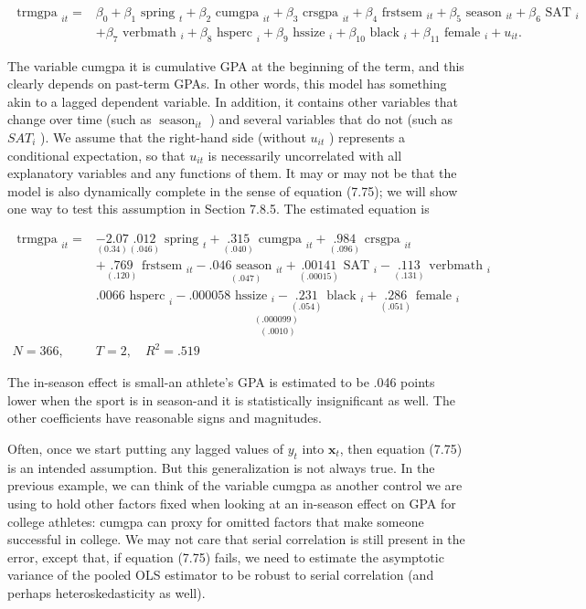 \documentclass[10pt]{article}
\begin{document}
$$
\begin{aligned}
\text { trmgpa }_{i t}= & \beta_{0}+\beta_{1} \text { spring }_{t}+\beta_{2} \text { cumgpa }_{i t}+\beta_{3} \text { crsgpa }_{i t}+\beta_{4} \text { frstsem }_{i t}+\beta_{5} \text { season }_{i t}+\beta_{6} \text { SAT }_{i} \\
& +\beta_{7} \text { verbmath }_{i}+\beta_{8} \text { hsperc }_{i}+\beta_{9} \text { hssize }_{i}+\beta_{10} \text { black }_{i}+\beta_{11} \text { female }_{i}+u_{i t} .
\end{aligned}
$$

The variable cumgpa it is cumulative GPA at the beginning of the term, and this clearly depends on past-term GPAs. In other words, this model has something akin to a lagged dependent variable. In addition, it contains other variables that change over time (such as $\operatorname{season}_{i t}$ ) and several variables that do not (such as $S A T_{i}$ ). We assume that the right-hand side (without $u_{i t}$ ) represents a conditional expectation, so that $u_{i t}$ is necessarily uncorrelated with all explanatory variables and any functions of them. It may or may not be that the model is also dynamically complete in the sense of equation (7.75); we will show one way to test this assumption in Section 7.8.5. The estimated equation is

$$
\begin{aligned}
\text { trmgpa }_{i t}= & \underset{(0.34)}{-2.07} \underset{(.046)}{.012} \text { spring }_{t}+\underset{(.040)}{.315} \text { cumgpa }_{i t}+\underset{(.096)}{.984} \text { crsgpa }_{i t} \\
& +\underset{(.120)}{.769} \text { frstsem }_{i t}-\underset{(.047)}{.046 \text { season }_{i t}}+\underset{(.00015)}{.00141} \text { SAT }_{i}-\underset{(.131)}{.113} \text { verbmath }_{i} \\
& \underset{(.0010)}{.0066 \text { hsperc }_{i}-\underset{(.000099)}{.000058 \text { hssize }_{i}-\underset{(.054)}{.231} \text { black }_{i}}+\underset{(.051)}{.286} \text { female }_{i}} \\
N=366, \quad & T=2, \quad R^{2}=.519
\end{aligned}
$$

The in-season effect is small-an athlete's GPA is estimated to be .046 points lower when the sport is in season-and it is statistically insignificant as well. The other coefficients have reasonable signs and magnitudes.

Often, once we start putting any lagged values of $y_{t}$ into $\mathbf{x}_{t}$, then equation (7.75) is an intended assumption. But this generalization is not always true. In the previous example, we can think of the variable cumgpa as another control we are using to hold other factors fixed when looking at an in-season effect on GPA for college athletes: cumgpa can proxy for omitted factors that make someone successful in college. We may not care that serial correlation is still present in the error, except that, if equation (7.75) fails, we need to estimate the asymptotic variance of the pooled OLS estimator to be robust to serial correlation (and perhaps heteroskedasticity as well).
\end{document}
